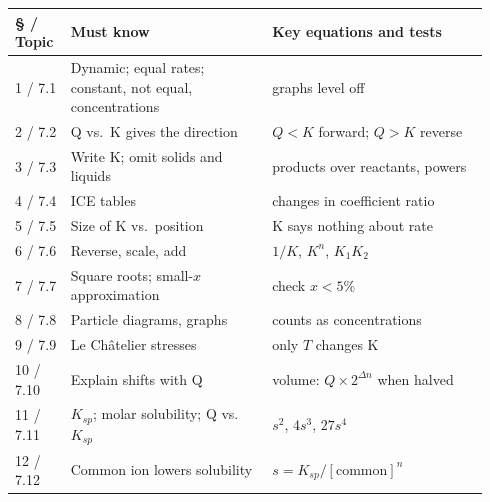 \documentclass[11pt]{article}
\begin{document}
\begin{longtable}{@{}p{0.11\linewidth}p{0.40\linewidth}p{0.43\linewidth}@{}}\toprule
\S{} / Topic & Must know & Key equations and tests \\ \midrule
1 / 7.1 & Dynamic; equal rates; constant, not equal, concentrations & graphs level off \\[3pt]
2 / 7.2 & Q vs.\ K gives the direction & $Q<K$ forward; $Q>K$ reverse \\[3pt]
3 / 7.3 & Write K; omit solids and liquids & products over reactants, powers \\[3pt]
4 / 7.4 & ICE tables & changes in coefficient ratio \\[3pt]
5 / 7.5 & Size of K vs.\ position & K says nothing about rate \\[3pt]
6 / 7.6 & Reverse, scale, add & $1/K$, $K^n$, $K_1K_2$ \\[3pt]
7 / 7.7 & Square roots; small-$x$ approximation & check $x < 5\%$ \\[3pt]
8 / 7.8 & Particle diagrams, graphs & counts as concentrations \\[3pt]
9 / 7.9 & Le Châtelier stresses & only $T$ changes K \\[3pt]
10 / 7.10 & Explain shifts with Q & volume: $Q \times 2^{\Delta n}$ when halved \\[3pt]
11 / 7.11 & $K_{sp}$; molar solubility; Q vs.\ $K_{sp}$ & $s^2$, $4s^3$, $27s^4$ \\[3pt]
12 / 7.12 & Common ion lowers solubility & $s = K_{sp}/[\text{common}]^n$ \\ \bottomrule
\end{longtable}
\end{document}
